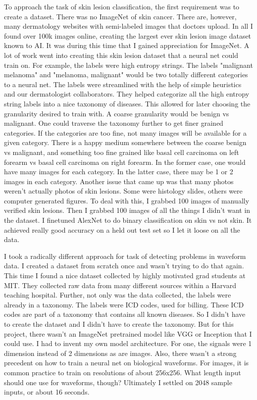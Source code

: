 To approach the task of skin lesion classification, the first requirement was to create a dataset.  There was no ImageNet of skin cancer.  There are, however, many dermatology websites with semi-labeled images that doctors upload.  In all I found over 100k images online, creating the largest ever skin lesion image dataset known to AI.  It was during this time that I gained appreciation for ImageNet.  A lot of work went into creating this skin lesion dataset that a neural net could train on.  For example, the labels were high entropy strings.  The labels "malignant melanoma" and "melanoma, malignant" would be two totally different categories to a neural net.  The labels were streamlined with the help of simple heuristics and our dermatologist collaborators.  They helped categorize all the high entropy string labels into a nice taxonomy of diseases.  This allowed for later choosing the granularity desired to train with.  A coarse granularity would be benign vs malignant.  One could traverse the taxonomy further to get finer grained categories.  If the categories are too fine, not many images will be available for a given category.  There is a happy medium somewhere between the coarse benign vs malignant, and something too fine grained like basal cell carcinoma on left forearm vs basal cell carcinoma on right forearm.  In the former case, one would have many images for each category.  In the latter case, there may be 1 or 2 images in each category.  Another issue that came up was that many photos weren't actually photos of skin lesions.  Some were histology slides, others were computer generated figures.  To deal with this, I grabbed 100 images of manually verified skin lesions.  Then I grabbed 100 images of all the things I didn't want in the dataset.  I finetuned AlexNet to do binary classification on skin vs not skin.  It achieved really good accuracy on a held out test set so I let it loose on all the data.

I took a radically different approach for task of detecting problems in waveform data.  I created a dataset from scratch once and wasn't trying to do that again.  This time I found a nice dataset collected by highly motivated grad students at MIT.  They collected raw data from many different sources within a Harvard teaching hospital.  Further, not only was the data collected, the labels were already in a taxonomy.  The labels were ICD codes, used for billing.  These ICD codes are part of a taxonomy that contains all known diseases.  So I didn't have to create the dataset and I didn't have to create the taxonomy.  But for this project, there wasn't an ImageNet pretrained model like VGG or Inception that I could use.  I had to invent my own model architecture.  For one, the signals were 1 dimension instead of 2 dimensions as are images.  Also, there wasn't a strong precedent on how to train a neural net on biological waveforms.  For images, it is common practice to train on resolutions of about 256x256.  What length input should one use for waveforms, though?  Ultimately I settled on 2048 sample inputs, or about 16 seconds.

